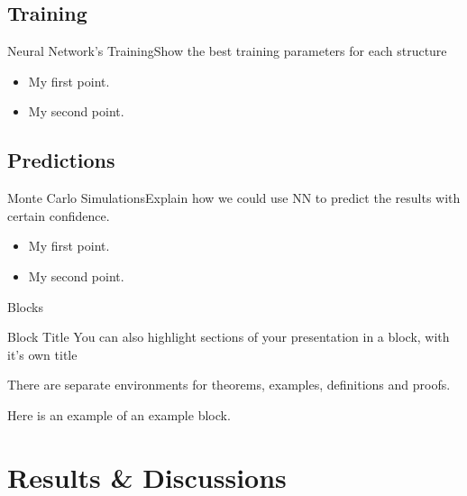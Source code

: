 \documentclass{beamer}
\begin{document}
\subsection{Training}
\begin{frame}{Neural Network's Training}{Show the best training parameters for each structure}
  \begin{itemize}
  \item {
    My first point.
  }
  \item {
    My second point.
  }
  \end{itemize}
\end{frame}

\subsection{Predictions}
\begin{frame}{Monte Carlo Simulations}{Explain how we could use NN to predict the results with certain confidence.}
  \begin{itemize}
  \item {
    My first point.
  }
  \item {
    My second point.
  }
  \end{itemize}
\end{frame}


\begin{frame}{Blocks}
\begin{block}{Block Title}
You can also highlight sections of your presentation in a block, with it's own title
\end{block}
\begin{theorem}
There are separate environments for theorems, examples, definitions and proofs.
\end{theorem}
\begin{example}
Here is an example of an example block.
\end{example}
\end{frame}


\section{Results \& Discussions}
\end{document}
